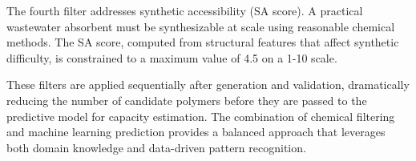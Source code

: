 The fourth filter addresses synthetic accessibility (SA score). A practical wastewater absorbent must be synthesizable at scale using reasonable chemical methods. The SA score, computed from structural features that affect synthetic difficulty, is constrained to a maximum value of 4.5 on a 1-10 scale.

These filters are applied sequentially after generation and validation, dramatically reducing the number of candidate polymers before they are passed to the predictive model for capacity estimation. The combination of chemical filtering and machine learning prediction provides a balanced approach that leverages both domain knowledge and data-driven pattern recognition.
